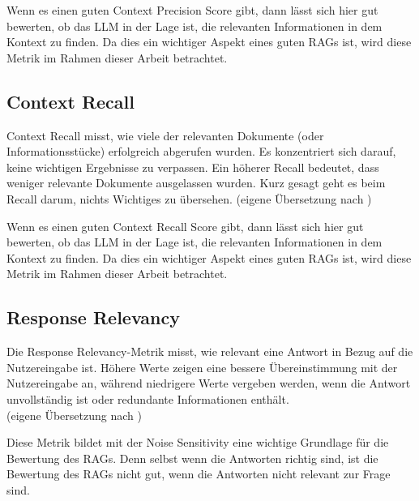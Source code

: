 Wenn es einen guten Context Precision Score gibt, dann lässt sich hier gut bewerten, ob das LLM in der Lage ist, die relevanten Informationen in dem Kontext zu finden.
Da dies ein wichtiger Aspekt eines guten RAGs ist, wird diese Metrik im Rahmen dieser Arbeit betrachtet.

\subsection{Context Recall}
\begin{plainquote}
Context Recall misst, wie viele der relevanten Dokumente (oder Informationsstücke) erfolgreich abgerufen wurden.
Es konzentriert sich darauf, keine wichtigen Ergebnisse zu verpassen.
Ein höherer Recall bedeutet, dass weniger relevante Dokumente ausgelassen wurden.
Kurz gesagt geht es beim Recall darum, nichts Wichtiges zu übersehen.
(eigene Übersetzung nach \cite{ragas_context_recall})
\end{plainquote}

Wenn es einen guten Context Recall Score gibt, dann lässt sich hier gut bewerten, ob das LLM in der Lage ist, die relevanten Informationen in dem Kontext zu finden.
Da dies ein wichtiger Aspekt eines guten RAGs ist, wird diese Metrik im Rahmen dieser Arbeit betrachtet.

\subsection{Response Relevancy}
\begin{plainquote}
Die Response Relevancy-Metrik misst, wie relevant eine Antwort in Bezug auf die Nutzereingabe ist. Höhere Werte zeigen eine bessere Übereinstimmung mit der Nutzereingabe an, während niedrigere Werte vergeben werden, wenn die Antwort unvollständig ist oder redundante Informationen enthält.\\
(eigene Übersetzung nach \cite{ragas_response_relevancy})
\end{plainquote}

Diese Metrik bildet mit der Noise Sensitivity eine wichtige Grundlage für die Bewertung des RAGs.
Denn selbst wenn die Antworten richtig sind, ist die Bewertung des RAGs nicht gut, wenn die Antworten nicht relevant zur Frage sind.

